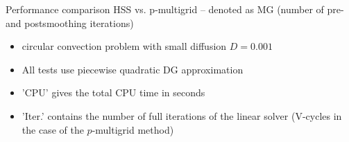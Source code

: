 \documentclass[mathserif]{beamer}
\begin{document}
\begin{frame}

{\large Performance comparison HSS vs. p-multigrid -- denoted as MG (number of pre- and postsmoothing iterations)}
\begin{itemize}
\item circular convection problem with small diffusion $D=0.001$
\item \vspace{-2mm}All tests use piecewise quadratic DG approximation
\item \vspace{-2mm}'CPU' gives the total CPU time in seconds
\item \vspace{-2mm}'Iter.' contains the number of full iterations of the linear solver (V-cycles in the case of the $p$-multigrid method)
\end{itemize}


\end{frame}
\end{document}
